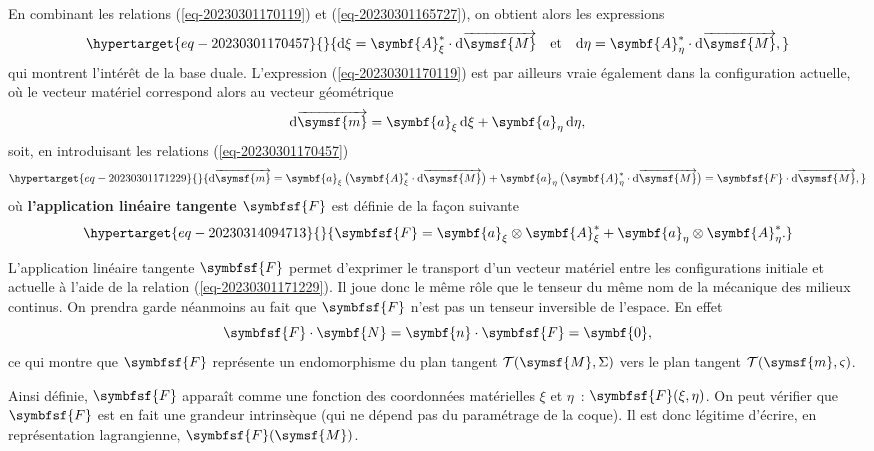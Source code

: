\documentclass[
  a4paper,
  DIV=11,
  numbers=noendperiod]{scrreprt}
\newcommand{\altvec}[1]{\overrightarrow{#1}}
\newcommand{\D}{{\mathrm d}}
\newcommand{\point}[1]{\symsf{#1}}
\newcommand{\tens}[1]{\symbfsf{#1}}
\renewcommand{\vec}[1]{\symbf{#1}}
\begin{document}
En combinant les relations (\ref{eq-20230301170119}) et
(\ref{eq-20230301165727}), on obtient alors les expressions
\begin{equation}\protect\hypertarget{eq-20230301170457}{}{
\D \xi = \vec{A}_\xi^\ast \cdot \D \altvec{\point{M}} \quad \text{et} \quad \D \eta = \vec{A}_\eta^\ast \cdot \D \altvec{\point{M}},
}\label{eq-20230301170457}\end{equation} qui montrent l'intérêt de la
base duale. L'expression (\ref{eq-20230301170119}) est par ailleurs
vraie également dans la configuration actuelle, où le vecteur matériel
correspond alors au vecteur géométrique \[
\D \altvec{\point{m}} = \vec{a}_\xi \, \D \xi + \vec{a}_\eta \, \D \eta,
\] soit, en introduisant les relations (\ref{eq-20230301170457})
\begin{equation}\protect\hypertarget{eq-20230301171229}{}{
\D \altvec{\point{m}} = \vec{a}_\xi \, \bigl( \vec{A}_\xi^\ast \cdot \D \altvec{\point{M}} \bigr) + \vec{a}_\eta \, \bigl( \vec{A}_\eta^\ast \cdot \D \altvec{\point{M}} \bigr) = \tens{F} \cdot \D \altvec{\point{M}},
}\label{eq-20230301171229}\end{equation} où \textbf{l'application
linéaire tangente \(\tens{F}\)} est définie de la façon suivante
\begin{equation}\protect\hypertarget{eq-20230314094713}{}{
\tens{F} = \vec{a}_\xi \otimes \vec{A}_\xi^\ast + \vec{a}_\eta \otimes \vec{A}_\eta^\ast.
}\label{eq-20230314094713}\end{equation}

L'application linéaire tangente \(\tens{F}\) permet d'exprimer le
transport d'un vecteur matériel entre les configurations initiale et
actuelle à l'aide de la relation (\ref{eq-20230301171229}). Il joue donc
le même rôle que le tenseur du même nom de la mécanique des milieux
continus. On prendra garde néanmoins au fait que \(\tens{F}\) n'est pas
un tenseur inversible de l'espace. En effet \[
\tens{F} \cdot \vec{N} = \vec{n} \cdot \tens{F} = \vec{0},
\] ce qui montre que \(\tens{F}\) représente un endomorphisme du plan
tangent \(\mathcal{T}(\point{M}, \Sigma)\) vers le plan tangent
\(\mathcal{T}(\point{m}, \varsigma)\).

\begin{tcolorbox}[enhanced jigsaw, toptitle=1mm, title=\textcolor{quarto-callout-note-color}{\faInfo}\hspace{0.5em}{Note}, colbacktitle=quarto-callout-note-color!10!white, toprule=.15mm, left=2mm, bottomrule=.15mm, arc=.35mm, breakable, opacityback=0, colframe=quarto-callout-note-color-frame, bottomtitle=1mm, titlerule=0mm, leftrule=.75mm, opacitybacktitle=0.6, coltitle=black, rightrule=.15mm, colback=white]

Ainsi définie, \(\tens{F}\) apparaît comme une fonction des coordonnées
matérielles \(\xi\) et \(\eta\)~: \(\tens{F}(\xi, \eta)\). On peut
vérifier que \(\tens{F}\) est en fait une grandeur intrinsèque (qui ne
dépend pas du paramétrage de la coque). Il est donc légitime d'écrire,
en représentation lagrangienne, \(\tens{F}(\point{M})\).

\end{tcolorbox}
\end{document}

